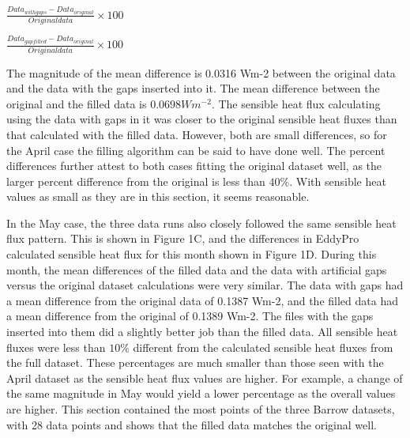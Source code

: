 $\frac{Data_{with gaps} - Data_{original}}{Original data} \times 100$

$\frac{Data_{gap filled} - Data_{original}}{Original data} \times 100$

The magnitude of the mean difference is 0.0316 Wm-2 between the original data and the data with the gaps inserted into it. The mean difference between the original and the filled data is $0.0698 Wm^{-2}$. The sensible heat flux calculating using the data with gaps in it was closer to the original sensible heat fluxes than that calculated with the filled data. However, both are small differences, so for the April case the filling algorithm can be said to have done well.  The percent differences further attest to both cases fitting the original dataset well, as the larger percent difference from the original is less than $40\%$. With sensible heat values as small as they are in this section, it seems reasonable.

In the May case, the three data runs also closely followed the same sensible heat flux pattern. This is shown in Figure 1C, and the differences in EddyPro calculated sensible heat flux for this month shown in Figure 1D. During this month, the mean differences of the filled data and the data with artificial gaps versus the original dataset calculations were very similar. The data with gaps had a mean difference from the original data of 0.1387 Wm-2, and the filled data had a mean difference from the original of 0.1389 Wm-2. The files with the gaps inserted into them did a slightly better job than the filled data. All sensible heat fluxes were less than $10\%$ different from the calculated sensible heat fluxes from the full dataset. These percentages are much smaller than those seen with the April dataset as the sensible heat flux values are higher. For example, a change of the same magnitude in May would yield a lower percentage as the overall values are higher. This section contained the most points of the three Barrow datasets, with 28 data points and shows that the filled data matches the original well. 
 


